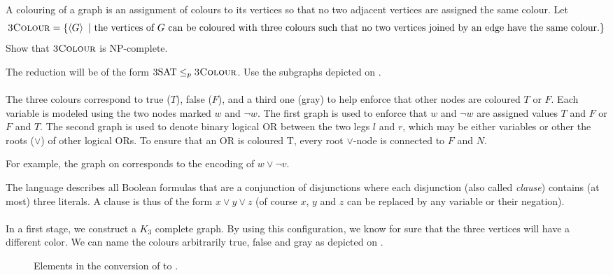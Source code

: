 \documentclass{article}
\begin{document}
\begin{exercise}
A colouring of a graph is an assignment of colours to its vertices so that no two adjacent vertices are assigned the same colour. Let
\begin{equation}
\mbox{\textsc{3Colour}}=\left\{ \left\langle G \right\rangle\ |\ \mbox{the vertices of $G$ can be coloured with three colours such that no two vertices joined by an edge have the same colour.} \right\}
\end{equation}
Show that $\mbox{\textsc{3Colour}}$ is $\mbox{NP-complete}$.
\begin{hint}
The reduction will be of the form $\mbox{3SAT}\leq_p\mbox{\textsc{3Colour}}$. Use the subgraphs depicted on .
\paragraph{}
The three colours correspond to true ($T$), false ($F$), and a third one (gray) to help enforce that other nodes are coloured $T$ or $F$. Each variable is modeled using the two nodes marked $w$ and $\neg w$. The first graph is used to enforce that $w$ and $\neg w$ are assigned values $T$ and $F$ or $F$ and $T$. The second graph is used to denote binary logical OR between the two legs $l$ and $r$, which may be either variables or other the roots ($\vee$) of other logical ORs. To ensure that an OR is coloured T, every root $\vee$-node is connected to $F$ and $N$.
\begin{example}
For example, the graph on  corresponds to the encoding of $w\vee\neg v$.
\end{example}
\end{hint}
\begin{answer}
The  language describes all Boolean formulas that are a conjunction of disjunctions where each disjunction (also called \emph{clause}) contains (at most) three literals. A clause is thus of the form $x\vee y\vee z$ (of course $x$, $y$ and $z$ can be replaced by any variable or their negation).
\paragraph{}
In a first stage, we construct a $K_3$ complete graph. By using this configuration, we know for sure that the three vertices will have a different color. We can name the colours arbitrarily true, false and gray as depicted on .
\begin{figure}[hbt]
\centering
{}
\caption{Elements in the conversion of  to .}
\end{figure}

\end{answer}
\end{exercise}
\end{document}
